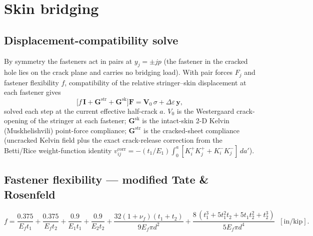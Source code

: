 \documentclass[11pt]{article}
\begin{document}
\section{Skin bridging}
\label{sec:bridge}

\subsection{Displacement-compatibility solve}
By symmetry the fasteners act in pairs at $y_j=\pm jp$ (the fastener in the
cracked hole lies on the crack plane and carries no bridging load). With pair
forces $F_j$ and fastener flexibility $f$, compatibility of the relative
stringer--skin displacement at each fastener gives
\begin{equation}
\bigl[f\,\mathbf I + \mathbf G^{\text{str}} + \mathbf G^{\text{sk}}\bigr]\mathbf F
   = \mathbf V_0\,\sigma + \Delta\varepsilon\,\mathbf y,
\label{eq:compat}
\end{equation}
solved each step at the current effective half-crack $a$. $V_0$ is the
Westergaard crack-opening of the stringer at each fastener; $\mathbf G^{\text{sk}}$
is the intact-skin 2-D Kelvin (Muskhelishvili) point-force compliance;
$\mathbf G^{\text{str}}$ is the cracked-sheet compliance (uncracked Kelvin field
plus the exact crack-release correction from the Betti/Rice weight-function
identity $v^{\text{corr}}_{ij}=-(t_1/E_1)\int_0^a[K^+_iK^+_j+K^-_iK^-_j]\,da'$).

\subsection{Fastener flexibility --- modified Tate \& Rosenfeld}
\begin{equation}
f=\frac{0.375}{E_f t_1}+\frac{0.375}{E_f t_2}
 +\frac{0.9}{E_1 t_1}+\frac{0.9}{E_2 t_2}
 +\frac{32(1+\nu_f)(t_1+t_2)}{9E_f\pi d^2}
 +\frac{8\,(t_1^3+5t_1^2t_2+5t_1t_2^2+t_2^3)}{5E_f\pi d^4}\;\;[\text{in/kip}].
\end{equation}
\end{document}
